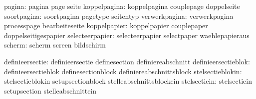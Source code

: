                        pagina:  pagina                       page
                                seite
                 koppelpagina:  koppelpagina                 couplepage
                                doppelseite
                  soortpagina:  soortpagina                  pagetype
                                seitentyp
                verwerkpagina:  verwerkpagina                processpage
                                bearbeiteseite
                 koppelpapier:  koppelpapier                 couplepaper
                                doppelseitigespapier
              selecteerpapier:  selecteerpapier              selectpaper
                                waehlepapieraus
                       scherm:  scherm                       screen
                                bildschirm

              definieersectie:  definieersectie              definesection
                                definiereabschnitt
          definieersectieblok:  definieersectieblok          definesectionblock
                                definiereabschnittsblock
             stelsectieblokin:  stelsectieblokin             setupsectionblock
                                stelleabschnittsblockein
                 stelsectiein:  stelsectiein                 setupsection
                                stelleabschnittein

